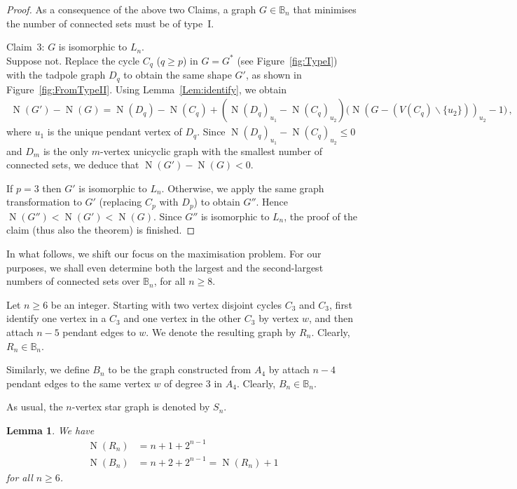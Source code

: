 \documentclass[a4paper,12pt]{amsart}
\newtheorem{lemma}{Lemma}
\theoremstyle{remark}
\DeclareMathOperator{\N}{N}
\begin{document}
\begin{proof}
\medskip
As a consequence of the above two Claims, a graph $G\in \mathbb{B}_n$ that minimises the number of connected sets must be of type~I.

{\sc Claim~3}: $G$ is isomorphic to $L_n$.\\
Suppose not. Replace the cycle $C_q$ ($q\geq p$) in $G=G^*$ (see Figure~\ref{fig:TypeI}) with the tadpole graph $D_q$ to obtain the same shape $G'$, as shown in Figure~\ref{fig:FromTypeII}. Using Lemma~\ref{Lem:identify}, we obtain
\begin{align*}
\N(G')-\N(G) = \N(D_q)-\N(C_q) + (\N(D_q)_{u_1} - \N(C_q)_{u_2} ) \big(\N (G - (V(C_q)\backslash \{u_2\}))_{u_2} -1 \big) \,,
\end{align*}
where $u_1$ is the unique pendant vertex of $D_q$. Since $\N(D_q)_{u_1} - \N(C_q)_{u_2} \leq 0$ and $D_m$ is the only $m$-vertex unicyclic graph with the smallest number of connected sets, we deduce that $\N(G')-\N(G) < 0$.

If $p=3$ then $G'$ is isomorphic to $L_n$. Otherwise, we apply the same graph transformation to $G'$ (replacing $C_p$ with $D_p$) to obtain $G''$. Hence  $\N(G'') < \N(G') < \N(G)$. Since $G''$ is isomorphic to $L_n$, the proof of the claim (thus also the theorem) is finished.
\end{proof}

\medskip
In what follows, we shift our focus on the maximisation problem. For our purposes, we shall even determine both the largest and the second-largest numbers of connected sets over $\mathbb{B}_n$, for all $n\geq 8$.

\medskip
Let $n\geq 6$ be an integer. Starting with two vertex disjoint cycles $C_3$ and $C_3$, first identify one vertex in a $C_3$ and one vertex in the other $C_3$ by vertex $w$, and then attach $n-5$ pendant edges to $w$. We denote the resulting graph by $R_n$. Clearly, $R_n \in \mathbb{B}_n$.

Similarly, we define $B_n$ to be the graph constructed from $A_4$ by attach $n-4$ pendant edges to the same vertex $w$ of degree $3$ in $A_4$. Clearly, $B_n \in \mathbb{B}_n$.

As usual, the $n$-vertex star graph is denoted by $S_n$.

\begin{lemma}\label{Form:RnBn}
We have
\begin{align*}
\N(R_n)&=n+1+2^{n-1}\\
\N(B_n)&=n+2+2^{n-1} =\N(R_n) +1
\end{align*}
for all $n\geq 6$.
\end{lemma}
\end{document}
